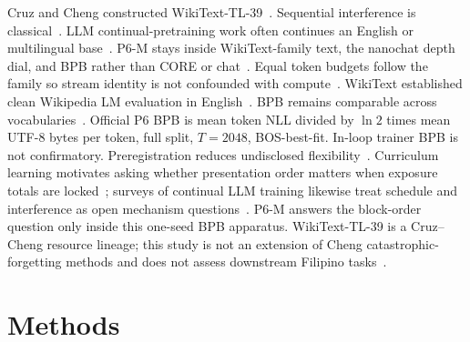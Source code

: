 \documentclass[11pt,a4paper]{article}
\begin{document}
Cruz and Cheng constructed WikiText-TL-39~\cite{cruz2019eval}. Sequential interference is classical~\cite{mccloskey1989catastrophic,french1999cf}. LLM continual-pretraining work often continues an English or multilingual base~\cite{luo2023forgetting,ramasesh2021forgetscale,shi2024continual}. P6-M stays inside WikiText-family text, the nanochat depth dial, and BPB rather than CORE or chat~\cite{karpathy2026nanochat}. Equal token budgets follow the family so stream identity is not confounded with compute~\cite{kaplan2020scaling,hoffmann2022chinchilla,muennighoff2023dataconstrained}. WikiText established clean Wikipedia LM evaluation in English~\cite{merity2017pointer}. BPB remains comparable across vocabularies~\cite{shannon1951prediction,brown2020gpt3}. Official P6 BPB is mean token NLL divided by $\ln 2$ times mean UTF-8 bytes per token, full split, $T=2048$, BOS-best-fit. In-loop trainer BPB is not confirmatory. Preregistration reduces undisclosed flexibility~\cite{nosek2018prereg,wagenmakers2012confirmatory}. Curriculum learning motivates asking whether presentation order matters when exposure totals are locked~\cite{bengio2009curriculum}; surveys of continual LLM training likewise treat schedule and interference as open mechanism questions~\cite{shi2024continual}. P6-M answers the block-order question only inside this one-seed BPB apparatus. WikiText-TL-39 is a Cruz--Cheng resource lineage; this study is not an extension of Cheng catastrophic-forgetting methods and does not assess downstream Filipino tasks~\cite{cruz2020degradation}.

\section{Methods}
\label{sec:methods}
\end{document}
